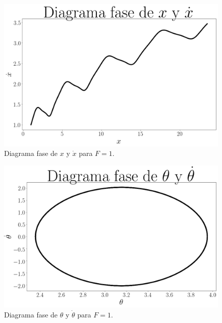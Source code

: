 \documentclass[12pt,letterpaper]{article}
\begin{document}
\begin{figure}[h]
 \centering
 \includegraphics[scale=0.2]{img/dp_phase_x_dx_f1.png}
 \caption{Diagrama fase de $x$ y $\dot{x}$ para $F=1$.}
 \label{fig: dp phase x dx force 1}
\end{figure}

\begin{figure}[h]
 \centering
 \includegraphics[scale=0.2]{img/dp_phase_theta_dtheta_f1.png}
\caption{Diagrama fase de $\theta$ y $\dot{\theta}$ para $F=1$.}
 \label{fig: dp phase theta dtheta force 1}
\end{figure}

\pagebreak


\end{document}
